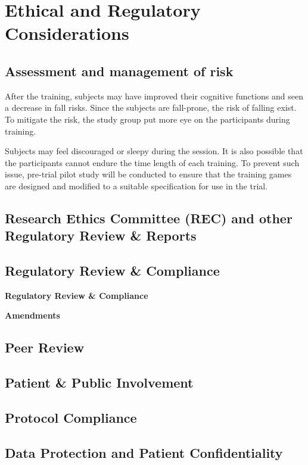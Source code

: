 \documentclass{article}
\begin{document}
\section{Ethical and Regulatory Considerations}

\subsection{Assessment and management of risk}
After the training, subjects may have improved their cognitive functions and seen a decrease in fall risks. Since the subjects are fall-prone, the risk of falling exist. To mitigate the risk, the study group put more eye on the participants during training.

Subjects may feel discouraged or sleepy during the session. It is also possible that the participants cannot endure the time length of each training. To prevent such issue, pre-trial pilot study will be conducted to ensure that the training games are designed and modified to a suitable specification for use in the trial.
\subsection{Research Ethics Committee (REC) and other Regulatory Review \& Reports}

\subsection{Regulatory Review \& Compliance}

\textbf{Regulatory Review \& Compliance}

\textbf{Amendments}

\subsection{Peer Review}
\subsection{Patient \& Public Involvement}
\subsection{Protocol Compliance}

\subsection{Data Protection and Patient Confidentiality}
\end{document}
